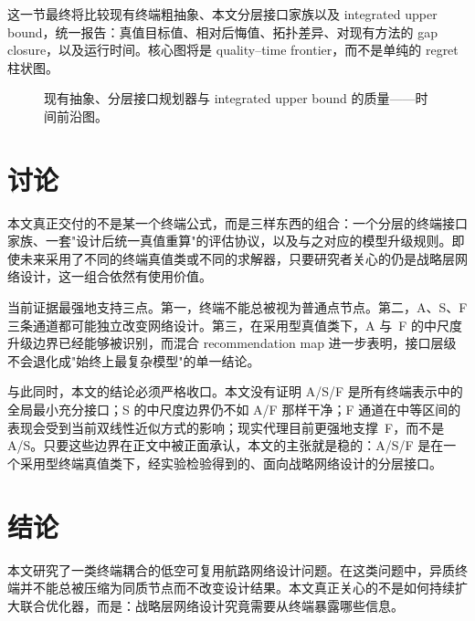\documentclass[review,authoryear]{elsarticle}
\begin{document}
这一节最终将比较现有终端粗抽象、本文分层接口家族以及 integrated upper bound，统一报告：真值目标值、相对后悔值、拓扑差异、对现有方法的 gap closure，以及运行时间。核心图将是 quality--time frontier，而不是单纯的 regret 柱状图。

\begin{figure}[htbp]
  \centering
  \caption{现有抽象、分层接口规划器与 integrated upper bound 的质量——时间前沿图。}
  \label{fig:frontier}
\end{figure}


\section{讨论}
\label{sec:discussion}

本文真正交付的不是某一个终端公式，而是三样东西的组合：一个分层的终端接口家族、一套"设计后统一真值重算"的评估协议，以及与之对应的模型升级规则。即使未来采用了不同的终端真值类或不同的求解器，只要研究者关心的仍是战略层网络设计，这一组合依然有使用价值。

当前证据最强地支持三点。第一，终端不能总被视为普通点节点。第二，A、S、F 三条通道都可能独立改变网络设计。第三，在采用型真值类下，A 与~F 的中尺度升级边界已经能够被识别，而混合 recommendation map 进一步表明，接口层级不会退化成"始终上最复杂模型"的单一结论。

与此同时，本文的结论必须严格收口。本文没有证明 A/S/F 是所有终端表示中的全局最小充分接口；S 的中尺度边界仍不如 A/F 那样干净；F 通道在中等区间的表现会受到当前双线性近似方式的影响；现实代理目前更强地支撑~F，而不是 A/S。只要这些边界在正文中被正面承认，本文的主张就是稳的：A/S/F 是在一个采用型终端真值类下，经实验检验得到的、面向战略网络设计的分层接口。


\section{结论}
\label{sec:conclusions}

本文研究了一类终端耦合的低空可复用航路网络设计问题。在这类问题中，异质终端并不能总被压缩为同质节点而不改变设计结果。本文真正关心的不是如何持续扩大联合优化器，而是：战略层网络设计究竟需要从终端暴露哪些信息。
\end{document}
